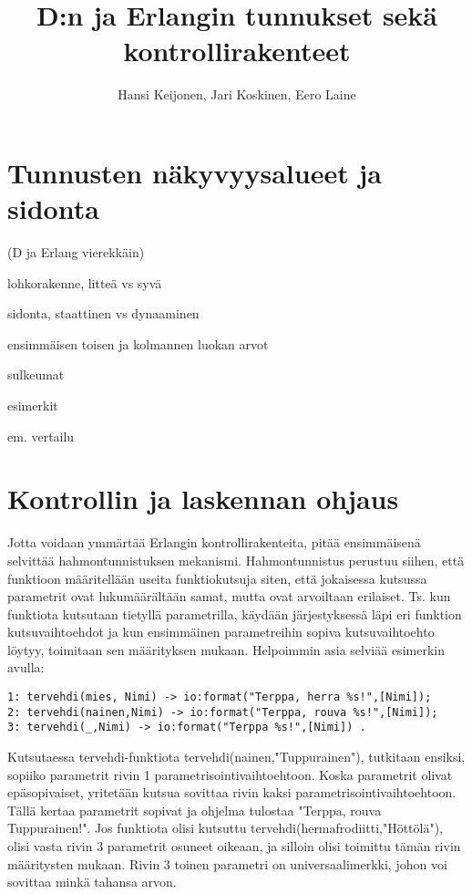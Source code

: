 \documentclass[11pt,oneside,a4paper]{article}
\title{D:n ja Erlangin tunnukset sekä kontrollirakenteet}
\author{Hansi Keijonen, Jari Koskinen, Eero Laine}
\begin{document}
\maketitle



\section{Tunnusten näkyvyysalueet ja sidonta}
(D ja Erlang vierekkäin)

lohkorakenne, litteä vs syvä

sidonta, staattinen vs dynaaminen

ensimmäisen toisen ja kolmannen luokan arvot

sulkeumat

esimerkit

em. vertailu

\section{Kontrollin ja laskennan ohjaus}
Jotta voidaan ymmärtää Erlangin kontrollirakenteita, pitää ensimmäisenä selvittää hahmontunnistuksen mekanismi. Hahmontunnistus perustuu siihen, että
funktioon määritellään useita funktiokutsuja siten, että jokaisessa kutsussa parametrit ovat lukumäärältään samat, mutta ovat arvoiltaan erilaiset. Ts. kun 
funktiota kutsutaan tietyllä parametrilla, käydään järjestyksessä läpi eri funktion kutsuvaihtoehdot ja kun ensimmäinen parametreihin sopiva kutsuvaihtoehto löytyy, 
toimitaan sen määrityksen mukaan. Helpoimmin asia selviää esimerkin avulla: 
\begin{verbatim}
1: tervehdi(mies, Nimi) -> io:format("Terppa, herra %s!",[Nimi]);
2: tervehdi(nainen,Nimi) -> io:format("Terppa, rouva %s!",[Nimi]);
3: tervehdi(_,Nimi) -> io:format("Terppa %s!",[Nimi]) . 
\end{verbatim}


Kutsutaessa tervehdi-funktiota tervehdi(nainen,"Tuppurainen"), tutkitaan ensiksi, sopiiko parametrit  rivin 1 parametrisointivaihtoehtoon. Koska parametrit olivat epäsopivaiset, 
yritetään kutsua sovittaa rivin kaksi parametrisointivaihtoehtoon. Tällä kertaa parametrit sopivat ja ohjelma tulostaa "Terppa, rouva Tuppurainen!". Jos funktiota olisi kutsuttu
tervehdi(hermafrodiitti,"Höttölä"), olisi vasta rivin 3 parametrit osuneet oikeaan, ja silloin olisi toimittu tämän rivin määritysten mukaan. 
Rivin 3 toinen parametri on universaalimerkki, 
johon voi sovittaa minkä tahansa arvon.
\end{document}
